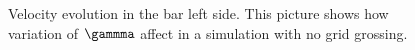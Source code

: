 \documentclass{article}
\begin{document}
\begin{figure}\sidecaption
  \centering
  \caption{Velocity evolution in the bar left side. This picture
    shows how variation of $\gammma$ affect in a simulation
    with no grid grossing.}
  \label{fig:Velocity-Dyka-LME-gamma-comparative}
\end{figure}
\end{document}
